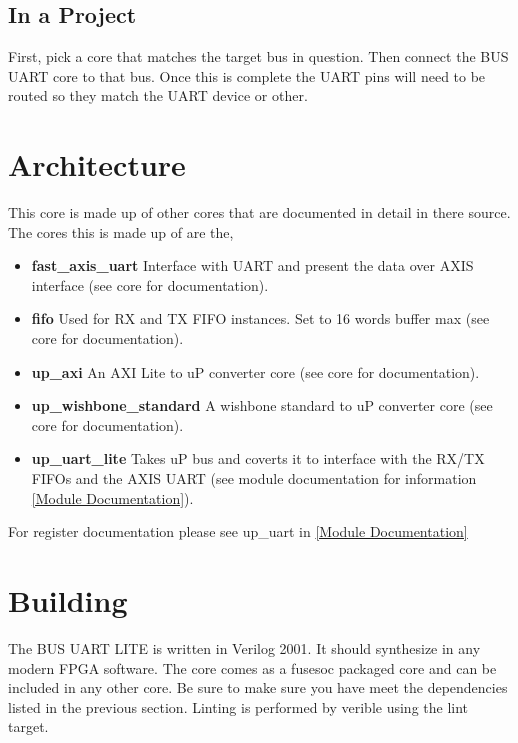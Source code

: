 





\subsection{In a Project}
\par
First, pick a core that matches the target bus in question. Then connect the BUS UART core to that bus. Once this is complete the UART pins will need
to be routed so they match the UART device or other.

\section{Architecture}
\par
This core is made up of other cores that are documented in detail in there source. The cores this is made up of are the,
\begin{itemize}
  \item \textbf{fast\_axis\_uart} Interface with UART and present the data over AXIS interface (see core for documentation).
  \item \textbf{fifo} Used for RX and TX FIFO instances. Set to 16 words buffer max (see core for documentation).
  \item \textbf{up\_axi} An AXI Lite to uP converter core (see core for documentation).
  \item \textbf{up\_wishbone\_standard} A wishbone standard to uP converter core (see core for documentation).
  \item \textbf{up\_uart\_lite} Takes uP bus and coverts it to interface with the RX/TX FIFOs and the AXIS UART (see module documentation for information \ref{Module Documentation}).
\end{itemize}

For register documentation please see up\_uart in \ref{Module Documentation}

\section{Building}

\par
The BUS UART LITE is written in Verilog 2001. It should synthesize in any modern FPGA software. The core comes as a fusesoc packaged core and can be included in any other core. Be sure to make sure you have meet the dependencies listed in the previous section. Linting is performed by verible using the lint target.

